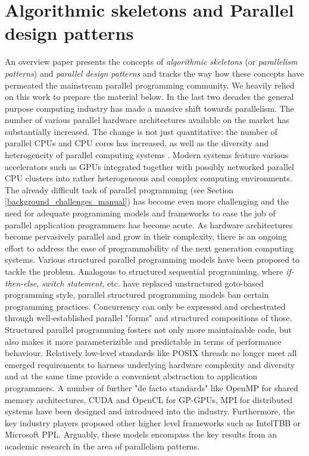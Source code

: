 \section{Algorithmic skeletons and Parallel design patterns}
\label{background_skeletons}
\quad An overview paper \cite{skeletons-overview} presents the concepts of \textit{algorithmic skeletons} (or \textit{parallelism patterns}) and \textit{parallel design patterns} and tracks the way how these concepts have permeated the mainstream parallel programming community. We heavily relied on this work to prepare the material below.\newline\null
\quad In the last two decades the general purpose computing industry has made a massive shift towards parallelism. The number of various parallel hardware architectures available on the market has substantially increased. The change is not just quantitative: the number of parallel CPUs and CPU cores has increased, as well as the diversity and heterogeneity of parallel computing systems \cite{welcome-to-the-jungle}. Modern systems feature various accelerators such as GPUs integrated together with possibly networked parallel CPU clusters into rather heterogeneous and complex computing environments.\newline\null
\quad The already difficult task of parallel programming (see Section \ref{background_challenges_manual}) has become even more challenging and the need for adequate programming models and frameworks to ease the job of parallel application programmers has become acute. As hardware architectures become pervasively parallel and grow in their complexity, there is an ongoing effort to address the ease of programmability of the next generation computing systems. Various structured parallel programming models have been proposed to tackle the problem.\newline\null
\quad Analogous to structured sequential programming, where \textit{if-then-else}, \textit{switch statement}, etc. have replaced unstructured goto-based programming style, parallel structured programming models ban certain programming practices. Concurrency can only be expressed and orchestrated through well-established parallel "forms" and structured compositions of those. Structured parallel programming fosters not only more maintainable code, but also makes it more parameterizible and predictable in terms of performance behaviour.\newline\null
\quad Relatively low-level standards like POSIX threads no longer meet all emerged requirements to harness underlying hardware complexity and diversity and at the same time provide a convenient abstraction to application programmers. A number of further "de facto standards" like OpenMP for shared memory architectures, CUDA and OpenCL for GP-GPUs, MPI for distributed systems have been designed and introduced into the industry. Furthermore, the key industry players proposed other higher level frameworks such as IntelTBB or Microsoft PPL. Arguably, these models encompass the key results from an academic research in the area of parallelism patterns.
